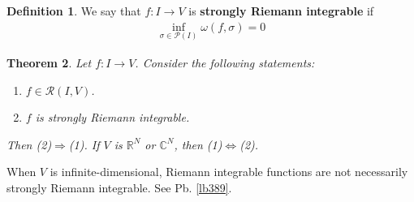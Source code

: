 \documentclass[12pt,b5paper,notitlepage]{article}
\theoremstyle{definition}
\newtheorem{df}{Definition}[section]
\theoremstyle{plain}
\newtheorem{thm}[df]{Theorem}
\newcommand{\mc}{\mathcal}
\newcommand{\scr}{\mathscr}
\newcommand{\Cbb}{\mathbb C}
\newcommand{\Rbb}{\mathbb R}
\numberwithin{equation}{section}
\begin{document}
\begin{df}
We say that $f:I\rightarrow V$ is \textbf{strongly Riemann integrable}  if 
\begin{align*}
\inf_{\sigma\in\mc P(I)} \omega(f,\sigma)=0
\end{align*}
\end{df}

\begin{thm}\label{lb410}
Let $f:I\rightarrow V$. Consider the following statements:
\begin{enumerate}[label=(\arabic*)]
\item $f\in\scr R(I,V)$.
\item $f$ is strongly Riemann integrable.
\end{enumerate}
Then (2)$\Rightarrow$(1). If $V$ is $\Rbb^N$ or $\Cbb^N$, then (1)$\Leftrightarrow$(2).
\end{thm}

When $V$ is infinite-dimensional, Riemann integrable functions are not necessarily strongly Riemann integrable. See Pb. \ref{lb389}.
\end{document}
